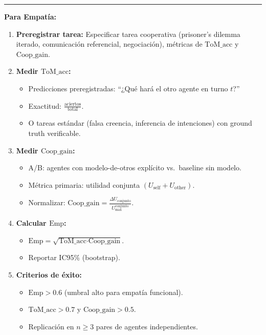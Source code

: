 \begin{center}\rule{0.5\linewidth}{0.5pt}\end{center}

\textbf{Para Empatía:}

\begin{enumerate}
\def\labelenumi{\arabic{enumi}.}
\item
  \textbf{Preregistrar tarea:} Especificar tarea cooperativa (prisoner's
  dilemma iterado, comunicación referencial, negociación), métricas de
  \(\text{ToM\_acc}\) y \(\text{Coop\_gain}\).
\item
  \textbf{Medir \(\text{ToM\_acc}\):}

  \begin{itemize}
  \tightlist
  \item
    Predicciones preregistradas: ``¿Qué hará el otro agente en turno
    \(t\)?''\\
  \item
    Exactitud: \(\frac{\text{aciertos}}{\text{total}}\).\\
  \item
    O tareas estándar (falsa creencia, inferencia de intenciones) con
    ground truth verificable.
  \end{itemize}
\item
  \textbf{Medir \(\text{Coop\_gain}\):}

  \begin{itemize}
  \tightlist
  \item
    A/B: agentes con modelo-de-otros explícito vs.~baseline sin
    modelo.\\
  \item
    Métrica primaria: utilidad conjunta
    \((U_{\text{self}} + U_{\text{other}})\).\\
  \item
    Normalizar:
    \(\text{Coop\_gain} = \frac{\Delta U_{\text{conjunto}}}{U_{\text{max}}^{\text{conjunto}}}\).
  \end{itemize}
\item
  \textbf{Calcular \(\text{Emp}\):}

  \begin{itemize}
  \tightlist
  \item
    \(\text{Emp} = \sqrt{\text{ToM\_acc} \cdot \text{Coop\_gain}}\).\\
  \item
    Reportar IC95\% (bootstrap).
  \end{itemize}
\item
  \textbf{Criterios de éxito:}

  \begin{itemize}
  \tightlist
  \item
    \(\text{Emp} > 0.6\) (umbral alto para empatía funcional).\\
  \item
    \(\text{ToM\_acc} > 0.7\) y \(\text{Coop\_gain} > 0.5\).\\
  \item
    Replicación en \(n \geq 3\) pares de agentes independientes.
  \end{itemize}
\end{enumerate}


